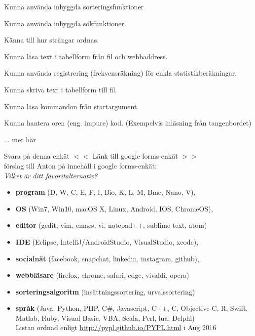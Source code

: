 

\Lab{\LabWeekTEN}

\begin{Goals}
\item Kunna använda inbyggda sorteringsfunktioner
\item Kunna använda inbyggda sökfunktioner.
\item Känna till hur strängar ordnas.
\item Kunna läsa text i tabellform från fil och webbaddress.
\item Kunna använda registrering (frekvensräkning) för enkla statistikberäkningar.
\item Kunna skriva text i tabellform till fil.
\item Kunna läsa kommandon från startargument.
\item Kunna hantera oren (eng. impure) kod. (Exempelvis inläsning från tangenbordet)
\item ... \TODO mer här
\end{Goals}

\begin{Preparations}
\item {}
\item {}
\item \ReadTheLab
\item Svara på denna enkät $<<$ \TODO Länk till google forms-enkät $>>$  \\
\TODO förslag till Anton på innehåll i google forms-enkät:\\ \textit{Vilket är ditt favoritalternativ?}
\begin{itemize}[nolistsep,noitemsep]
\item \textbf{program} (D, W, C, E, F, I, Bio, K, L, M, Bme, Nano, V), 
\item \textbf{OS} (Win7, Win10, macOS X, Linux, Android, IOS, ChromeOS), 
\item \textbf{editor} (gedit, vim, emacs, vi, notepad++, sublime text, atom)
\item \textbf{IDE} (Eclipse, IntelliJ/AndroidStudio, VisualStudio, xcode), 
\item \textbf{socialnät} (facebook, snapchat, linkedin, instagram, github), 
\item \textbf{webbläsare} (firefox, chrome, safari, edge, vivaldi, opera)
\item \textbf{sorteringsalgoritm} (insättningssortering, urvalssortering)
\item \textbf{språk} (Java, Python, PHP, C\#, Javascript, C++, C, Objective-C, R, Swift, Matlab, Ruby, Visual Basic, VBA, Scala, Perl, lua, Delphi)  \\
Listan ordnad enligt \url{http://pypl.github.io/PYPL.html} i Aug 2016
\end{itemize}
\end{Preparations}


